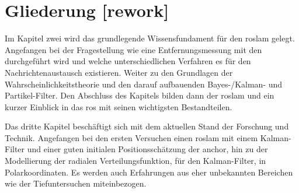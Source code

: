 \begin{comment}
------------------------------------------------------------------------------------------
- Die Vorgehensweise und die Wahl der Methode sollte begründet und dargelegt werden.
\end{comment}


\begin{comment}
------------------------------------------------------------------------------------------
- Wie ist die Bachelorarbeit aufgebaut?
- Was erwartet einen in den folgenden Kapitel/Abschnitten?
- Pro Kapitel einen Absatz.
- auf keinen Fall nur eine Wiederholung des Inhaltsverzeichnisses sein
- Wie bauen die Kapitel aufeinander auf? Dies muss erläutert und nicht nacherzählt werden.
- Überblick über den Aufbau der Bachelorarbeit: Wie bauen die einzelnen Kapitel aufeinander auf, welcher Argumentationslinie wird gefolgt; dieser sollte aber nie eine Nacherzählung der Inhaltsverzeichnisses sein!
- Schlussendlich gibst du dem Leser einen Gesamtüberblick über deine Bachelorarbeit, in dem du den Aufbau erläuterst, den roten Faden erkennen lässt und darstellst, wie die Forschungsfragen beantwortet werden.
\end{comment}
\section{Gliederung [rework]}

Im Kapitel zwei wird das grundlegende Wissensfundament für den \Gls{roslam} gelegt. Angefangen bei der Fragestellung wie eine Entfernungsmessung mit den  durchgeführt wird und welche unterschiedlichen Verfahren es für den Nachrichtenaustausch existieren. Weiter zu den Grundlagen der Wahrscheinlichkeitstheorie und den darauf aufbauenden Bayes-/Kalman- und Partikel-Filter. Den Abschluss des Kapitels bilden dann der \Gls{roslam} und ein kurzer Einblick in das \Gls{ros} mit seinen wichtigsten Bestandteilen.

Das dritte Kapitel beschäftigt sich mit dem aktuellen Stand der Forschung und Technik. Angefangen bei den ersten Versuchen einen \Gls{roslam} mit einem Kalman-Filter und einer guten initialen Positionsschätzung der \Gls{anchor}, hin zu der Modellierung der radialen Verteilungsfunktion, für den Kalman-Filter, in Polarkoordinaten. Es werden auch Erfahrungen aus eher unbekannten Bereichen wie der Tiefuntersuchen miteinbezogen.

